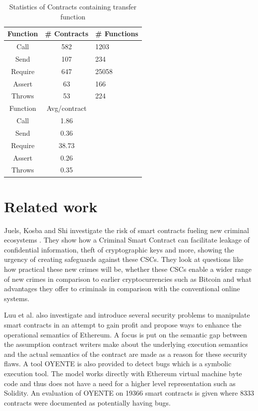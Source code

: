 \documentclass[10pt,conference]{IEEEtran}
\begin{document}
\begin{table}
  \caption{Statistics of Contracts containing transfer function}
  \label{tab:transfer}
  \begin{tabular}{ccl}
    \hline
    Function & \# Contracts & \# Functions\\
    \hline
    Call&582&1203\\
    Send&107&234\\
    Require&647&25058\\
    Assert&63&166\\
    Throws&53&224\\
    \hline
    Function & Avg/contract\\
    \hline
    Call&1.86\\
    Send&0.36\\
    Require&38.73\\
    Assert&0.26\\
    Throws&0.35\\
  \hline
\end{tabular}
\end{table}
\section{Related work}


Juels, Kosba and Shi\cite{criminal} investigate the risk of smart contracts fueling new criminal ecosystems . They show how a Criminal Smart Contract can facilitate leakage of confidential information, theft of cryptographic keys and more, showing the urgency of creating safeguards against these CSCs. They look at questions like how practical these new crimes will be, whether these CSCs enable a wider range of new crimes in comparison to earlier cryptocurrencies such as Bitcoin and what advantages they offer to criminals in comparison with the conventional online systems. 


Luu et al.  \cite{smarter} also investigate and introduce several security problems to manipulate smart contracts in an attempt to gain profit and propose ways to enhance the operational semantics of Ethereum. A focus is put on the semantic gap between the assumption contract writers make about the underlying execution semantics and the actual semantics of the contract are made as a reason for these security flaws. A tool OYENTE is also provided to detect bugs which is a symbolic execution tool. The model works directly with Ethereum virtual machine byte code and thus does not have a need for a higher level representation such as Solidity. An evaluation of OYENTE on 19366 smart contracts is given where 8333 contracts were documented as potentially having bugs.
\end{document}

